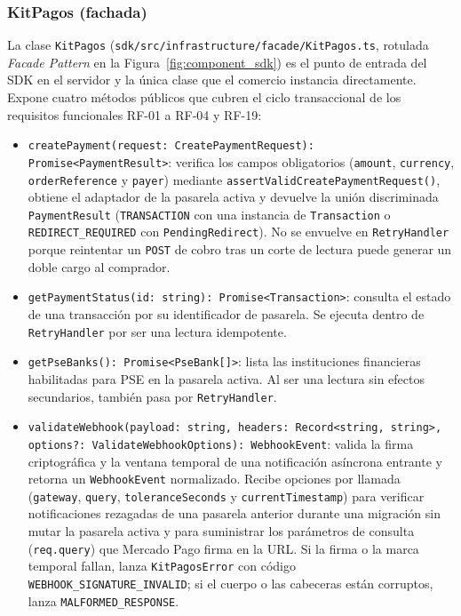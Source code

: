 \subsubsection{KitPagos (fachada)}
La clase \texttt{KitPagos} (\texttt{sdk/src/infrastructure/facade/KitPagos.ts}, rotulada \textit{Facade Pattern} en la Figura~\ref{fig:component_sdk}) es el punto de entrada del SDK en el servidor y la única clase que el comercio instancia directamente. Expone cuatro métodos públicos que cubren el ciclo transaccional de los requisitos funcionales RF-01 a RF-04 y RF-19:
\begin{itemize}\sloppy
  \item \texttt{createPayment(\allowbreak{}request: Create\allowbreak{}Payment\allowbreak{}Request): Promise<\allowbreak{}PaymentResult>}: verifica los campos obligatorios (\texttt{amount}, \texttt{currency}, \texttt{orderReference} y \texttt{payer}) mediante \texttt{assert\allowbreak{}Valid\allowbreak{}Create\allowbreak{}Payment\allowbreak{}Request()}, obtiene el adaptador de la pasarela activa y devuelve la unión discriminada \texttt{PaymentResult} (\texttt{TRANSACTION} con una instancia de \texttt{Transaction} o \texttt{REDIRECT\_\allowbreak{}REQUIRED} con \texttt{Pending\allowbreak{}Redirect}). No se envuelve en \texttt{RetryHandler} porque reintentar un \texttt{POST} de cobro tras un corte de lectura puede generar un doble cargo al comprador.
  \item \texttt{getPaymentStatus(id: string): Promise<Transaction>}: consulta el estado de una transacción por su identificador de pasarela. Se ejecuta dentro de \texttt{RetryHandler} por ser una lectura idempotente.
  \item \texttt{getPseBanks(): Promise<PseBank[]>}: lista las instituciones financieras habilitadas para PSE en la pasarela activa. Al ser una lectura sin efectos secundarios, también pasa por \texttt{RetryHandler}.
  \item \texttt{validateWebhook(\allowbreak{}payload: string, headers: Record<\allowbreak{}string, string>, options?: ValidateWebhookOptions): WebhookEvent}: valida la firma criptográfica y la ventana temporal de una notificación asíncrona entrante y retorna un \texttt{WebhookEvent} normalizado. Recibe opciones por llamada (\texttt{gateway}, \texttt{query}, \texttt{toleranceSeconds} y \texttt{currentTimestamp}) para verificar notificaciones rezagadas de una pasarela anterior durante una migración sin mutar la pasarela activa y para suministrar los parámetros de consulta (\texttt{req.\allowbreak{}query}) que Mercado Pago firma en la URL. Si la firma o la marca temporal fallan, lanza \texttt{KitPagosError} con código \texttt{WEBHOOK\_\allowbreak{}SIGNATURE\_\allowbreak{}INVALID}; si el cuerpo o las cabeceras están corruptos, lanza \texttt{MALFORMED\_\allowbreak{}RESPONSE}.
\end{itemize}

